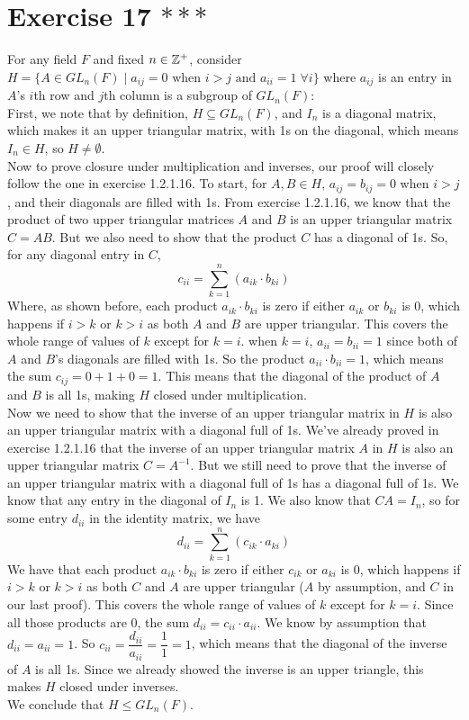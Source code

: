 \documentclass[12pt]{article}
\begin{document}
    \section*{Exercise 17 $***$}
    For any field $F$ and fixed $n \in \mathbb{Z}^+$,
    consider $H = \{ A \in GL_n(F) \mid a_{ij} = 0 \text{ when } i > j
    \text{ and } a_{ii} = 1 \; \forall i \}$
    where $a_{ij}$ is an entry in $A$'s $i$th row and $j$th column
    is a subgroup of $GL_n(F)$: \\
    First, we note that by definition, $H \subseteq GL_n(F)$,
    and $I_n$ is a diagonal matrix,
    which makes it an upper triangular matrix,
    with 1s on the diagonal,
    which means $I_n \in H$,
    so $H \neq \emptyset$. \\ 
    Now to prove closure under multiplication and inverses,
    our proof will closely follow the one in exercise 1.2.1.16.
    To start, for $A, B \in H$, $a_{ij} = b_{ij} = 0$ when $i > j$,
    and their diagonals are filled with 1s.
    From exercise 1.2.1.16, we know that the product
    of two upper triangular matrices $A$ and $B$ is an upper triangular
    matrix $C = AB$.
    But we also need to show that the product $C$ has a diagonal of 1s.
    So, for any diagonal entry in $C$,
    \[ c_{ii} = \sum_{k = 1}^n (a_{ik} \cdot b_{ki}) \]
    Where, as shown before,
    each product $a_{ik} \cdot b_{ki}$ is zero 
    if either $a_{ik}$ or $b_{ki}$ is 0,
    which happens if $i > k$ or $k > i$
    as both $A$ and $B$ are upper triangular.
    This covers the whole range of values of $k$
    except for $k = i$.
    when $k = i$, $a_{ii} = b_{ii} = 1$
    since both of $A$ and $B$'s diagonals are filled with 1s.
    So the product $a_{ii} \cdot b_{ii} = 1$,
    which means the sum $c_{ij} = 0 + 1 + 0 = 1$.
    This means that the diagonal of the product of $A$ and $B$ is all 1s, 
    making $H$ closed under multiplication. \\ 
    Now we need to show that the inverse of an upper triangular
    matrix in $H$ is also an upper triangular
    matrix with a diagonal full of 1s.
    We've already proved in exercise 1.2.1.16 that 
    the inverse of an upper triangular matrix $A$ in $H$
    is also an upper triangular matrix $C = A^{-1}$. 
    But we still need to prove that the inverse of an upper triangular
    matrix with a diagonal full of 1s has a diagonal full of 1s.
    We know that any entry in the diagonal of $I_n$ is 1.
    We also know that $CA = I_n$,
    so for some entry $d_{ii}$ in the identity matrix, we have
    \[ d_{ii} = \sum_{k = 1}^n (c_{ik} \cdot a_{ki}) \]
    We have that each product $a_{ik} \cdot b_{ki}$ is zero 
    if either $c_{ik}$ or $a_{ki}$ is 0,
    which happens if $i > k$ or $k > i$
    as both $C$ and $A$ are upper triangular
    ($A$ by assumption, and $C$ in our last proof).
    This covers the whole range of values of $k$
    except for $k = i$.
    Since all those products are 0,
    the sum $d_{ii} = c_{ii} \cdot a_{ii}$.
    We know by assumption that $d_{ii} = a_{ii} = 1$.
    So $c_{ii} = \dfrac{d_{ii}}{a_{ii}} = \dfrac{1}{1} = 1$,
    which means that the diagonal of the inverse of $A$ is all 1s.
    Since we already showed the inverse is an upper triangle,
    this makes $H$ closed under inverses. \\
    We conclude that $H \leqslant GL_n(F)$.
\end{document}
